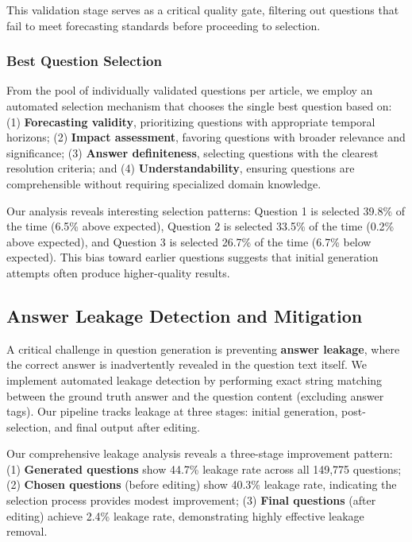 This validation stage serves as a critical quality gate, filtering out questions that fail to meet forecasting standards before proceeding to selection.

\subsubsection{Best Question Selection}
From the pool of individually validated questions per article, we employ an automated selection mechanism that chooses the single best question based on: (1) \textbf{Forecasting validity}, prioritizing questions with appropriate temporal horizons; (2) \textbf{Impact assessment}, favoring questions with broader relevance and significance; (3) \textbf{Answer definiteness}, selecting questions with the clearest resolution criteria; and (4) \textbf{Understandability}, ensuring questions are comprehensible without requiring specialized domain knowledge.

Our analysis reveals interesting selection patterns: Question 1 is selected 39.8\% of the time (6.5\% above expected), Question 2 is selected 33.5\% of the time (0.2\% above expected), and Question 3 is selected 26.7\% of the time (6.7\% below expected). This bias toward earlier questions suggests that initial generation attempts often produce higher-quality results.

\subsection{Answer Leakage Detection and Mitigation}
\label{subsec:leakage_detection}

A critical challenge in question generation is preventing \textbf{answer leakage}, where the correct answer is inadvertently revealed in the question text itself. We implement automated leakage detection by performing exact string matching between the ground truth answer and the question content (excluding answer tags). Our pipeline tracks leakage at three stages: initial generation, post-selection, and final output after editing.

Our comprehensive leakage analysis reveals a three-stage improvement pattern: (1) \textbf{Generated questions} show 44.7\% leakage rate across all 149,775 questions; (2) \textbf{Chosen questions} (before editing) show 40.3\% leakage rate, indicating the selection process provides modest improvement; (3) \textbf{Final questions} (after editing) achieve 2.4\% leakage rate, demonstrating highly effective leakage removal.

